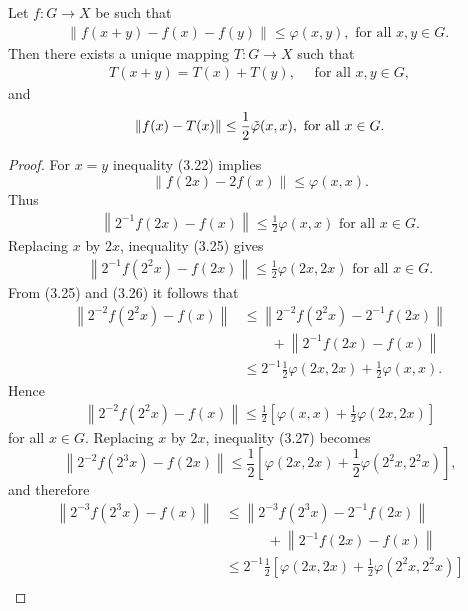 \documentclass[a4paper,12pt]{report}
\begin{document}
\begin{thm}
Let $f: G \rightarrow X$ be such that
\begin{eqnarray}
\|f(x+y)-f(x)-f(y)\| \le \varphi(x, y), \text { for all } x, y \in G \text {. }
\end{eqnarray}
Then there exists a unique mapping $T: G \rightarrow X$ such that
\begin{eqnarray}
T(x+y)=T(x)+T(y), \quad \text { for all } x, y \in G,
\end{eqnarray}
and
\begin{eqnarray}
\|f(x)-T(x)\| \le \frac{1}{2} \tilde{\varphi}(x, x), \text { for all } x \in G \text.
\end{eqnarray}
\begin{proof}
 For $x=y$ inequality (3.22) implies
$$
\|f(2 x)-2 f(x)\| \le \varphi(x, x) .
$$
Thus
\begin{eqnarray}
\left\|2^{-1} f(2 x)-f(x)\right\| \le \frac{1}{2} \varphi(x, x) \text { for all } x \in G .
\end{eqnarray}
Replacing $x$ by $2 x$, inequality (3.25) gives
\begin{eqnarray}
\left\|2^{-1} f\left(2^2 x\right)-f(2 x)\right\| \le \frac{1}{2} \varphi(2 x, 2 x) \text { for all } x \in G .
\end{eqnarray}
From (3.25) and (3.26) it follows that
$$
\begin{aligned}
	\left\|2^{-2} f\left(2^2 x\right)-f(x)\right\| & \le\left\|2^{-2} f\left(2^2 x\right)-2^{-1} f(2 x)\right\| \\
	& \quad \quad +\left\|2^{-1} f(2 x)-f(x)\right\| \\
	& \le 2^{-1} \frac{1}{2} \varphi(2 x, 2 x)+\frac{1}{2} \varphi(x, x) .
\end{aligned}
$$
Hence
\begin{eqnarray}
\left\|2^{-2} f\left(2^2 x\right)-f(x)\right\| \le \frac{1}{2}\left[\varphi(x, x)+\frac{1}{2} \varphi(2 x, 2 x)\right]
\end{eqnarray}
for all $x \in G$.
Replacing $x$ by $2 x$, inequality (3.27) becomes
$$
\left\|2^{-2} f\left(2^3 x\right)-f(2 x)\right\| \le \frac{1}{2}\left[\varphi(2 x, 2 x)+\frac{1}{2} \varphi\left(2^2 x, 2^2 x\right)\right],
$$
and therefore
$$
\begin{aligned}
	\left\|2^{-3} f\left(2^3 x\right)-f(x)\right\| & \le\left\|2^{-3} f\left(2^3 x\right)-2^{-1} f(2 x)\right\|\\&\quad\quad \quad +\left\|2^{-1} f(2 x)-f(x)\right\| \\
	& \le 2^{-1} \frac{1}{2}\left[\varphi(2 x, 2 x)+\frac{1}{2} \varphi\left(2^2 x, 2^2 x\right)\right]\\

\end{aligned}$$
\end{proof}
\end{thm}
\end{document}
